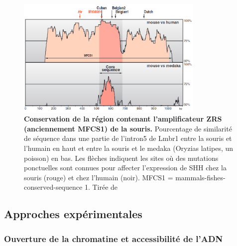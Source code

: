 \begin{figure}[h]
    \centering
    \includegraphics[width=0.8\textwidth, page=1] {figures/introduction/fig8.png}
    \caption[Conservation de la région contenant l'\gls{amplificateur} \acrshort{ZRS} (anciennement MFCS1) de la souris.]{
    \textbf{Conservation de la région contenant l'\gls{amplificateur} \acrshort{ZRS} (anciennement MFCS1) de la souris.}
    Pourcentage de similarité de séquence dans une partie de l'intron5 de Lmbr1 entre la souris et l'humain en haut et entre la souris et le medaka (Oryzias latipes, un poisson) en bas. Les flèches indiquent les sites où des mutations ponctuelles sont connues pour affecter l'expression de \acrshort{SHH} chez la souris (rouge) et chez l'humain (noir).
    MFCS1 = mammals-fishes-conserved-sequence 1.
    Tirée de \citep{sagai_elimination_2005}\\
    }
    \label{fig:Fig8}
\end{figure}

\subsection{Approches expérimentales}
\label{subsec:approch-expe}

\subsubsection{Ouverture de la chromatine et accessibilité de l’ADN}
\label{subsubsec:ouverture-chroma}

